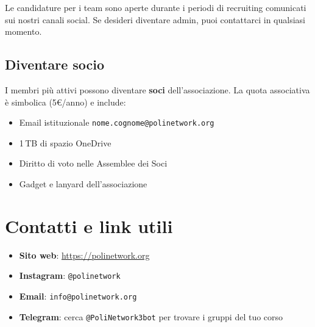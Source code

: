 \documentclass[report]{polinetwork}
\begin{document}
Le candidature per i team sono aperte durante i periodi di
recruiting comunicati sui nostri canali social. Se desideri
diventare admin, puoi contattarci in qualsiasi momento.

\subsection{Diventare socio}

I membri più attivi possono diventare \textbf{soci} dell'associazione.
La quota associativa è simbolica (5€/anno) e include:

\begin{itemize}
  \item Email istituzionale \texttt{nome.cognome@polinetwork.org}
  \item 1\,TB di spazio OneDrive
  \item Diritto di voto nelle Assemblee dei Soci
  \item Gadget e lanyard dell'associazione
\end{itemize}

\section{Contatti e link utili}

\begin{itemize}
  \item \textbf{Sito web}: \url{https://polinetwork.org}
  \item \textbf{Instagram}: \texttt{@polinetwork}
  \item \textbf{Email}: \texttt{info@polinetwork.org}
  \item \textbf{Telegram}: cerca \texttt{@PoliNetwork3bot} per
    trovare i gruppi del tuo corso
\end{itemize}


\vfill
\pnContactBlock
\end{document}
